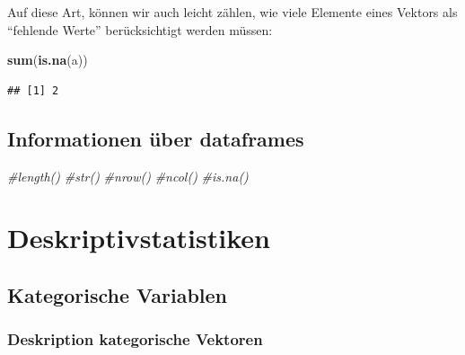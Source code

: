 \documentclass[
]{book}
\newenvironment{Shaded}{\begin{snugshade}}{\end{snugshade}}
\newcommand{\CommentTok}[1]{\textcolor[rgb]{0.56,0.35,0.01}{\textit{#1}}}
\newcommand{\FunctionTok}[1]{\textcolor[rgb]{0.13,0.29,0.53}{\textbf{#1}}}
\newcommand{\NormalTok}[1]{#1}
\begin{document}
Auf diese Art, können wir auch leicht zählen, wie viele Elemente eines Vektors als ``fehlende Werte'' berücksichtigt werden müssen:

\begin{Shaded}
\begin{Highlighting}[]
\FunctionTok{sum}\NormalTok{(}\FunctionTok{is.na}\NormalTok{(a))}
\end{Highlighting}
\end{Shaded}

\begin{verbatim}
## [1] 2
\end{verbatim}

\subsection{Informationen über dataframes}\label{informationen-uxfcber-dataframes}

\begin{Shaded}
\begin{Highlighting}[]
\CommentTok{\#length()}
\CommentTok{\#str()}
\CommentTok{\#nrow()}
\CommentTok{\#ncol()}
\CommentTok{\#is.na()}
\end{Highlighting}
\end{Shaded}

\section{Deskriptivstatistiken}\label{deskriptivstatistiken}

\subsection{Kategorische Variablen}\label{kategorische-variablen}

\subsubsection{Deskription kategorische Vektoren}\label{deskription-kategorische-vektoren}
\end{document}

